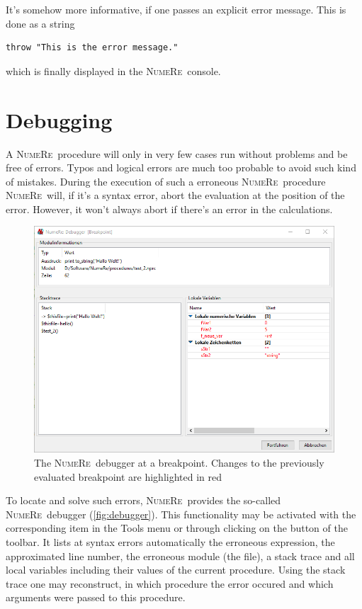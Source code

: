 \documentclass[DIV=14,headsepline,footsepline]{scrbook}
\newcommand{\NR}{\textsc{Nu\-me\-Re}}
\begin{document}
				It's somehow more informative, if one passes an explicit error message. This is done as a string
				\begin{lstlisting}
throw "This is the error message."
				\end{lstlisting}
				which is finally displayed in the \NR\ console.
			\section{Debugging}
				A \NR\ procedure will only in very few cases run without problems and be free of errors. Typos and logical errors are much too probable to avoid such kind of mistakes. During the execution of such a erroneous \NR\ procedure \NR\ will, if it's a syntax error, abort the evaluation at the position of the error. However, it won't always abort if there's an error in the calculations.
				\begin{figure}[htb]
					\centering
					\includegraphics[width=\textwidth]{_graphics/debugger.png}%
					\caption{The \NR\ debugger at a breakpoint. Changes to the previously evaluated breakpoint are highlighted in red}%
					\label{fig:debugger}%
				\end{figure}
				
				To locate and solve such errors, \NR\ provides the so-called \NR\ debugger (\autoref{fig:debugger}). This functionality may be activated with the corresponding item in the Tools menu or through clicking on the button of the toolbar. It lists at syntax errors automatically the erroneous expression, the approximated line number, the erroneous module (the file), a stack trace and all local variables including their values of the current procedure. Using the stack trace one may reconstruct, in which procedure the error occured and which arguments were passed to this procedure.
				
\end{document}

